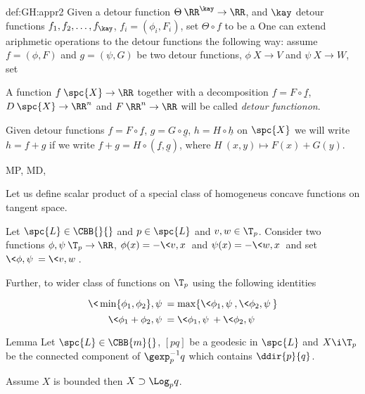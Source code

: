 {\begin{subthm}{def:GH:appr2}
Given a detour function $\Theta\:\RR^\kay\to\RR$, 
and $\kay$ detour functions $f_1,f_2,\dots, f_\kay$, $f_i=(\phi_i,F_i)$,
set $\Theta\circ f$ to be a 
One can extend ariphmetic operations to the detour functions the following way:
assume $f=(\phi,F)$ and $g=(\psi,G)$ be two detour functions, $\phi\:X\to V$ and $\psi\:X\to W$,
set 

A function $f\:\spc{X}\to\RR$ together with a decomposition $f=F\circ \underline f$, $D\:\spc{X}\to\RR^n$ and $F\:\RR^n\to\RR$  will be called \emph{detour functionon}.

Given detour functions $f=F\circ \underline f$, $g=G\circ \underline g$, $h=H\circ \underline h$ on $\spc{X}$ we will write $h=f+g$ if
we write 
$f+g=H\circ(\underline f,\underline g)$, where $H\:(x,y)\mapsto F(x)+G(y)$.


MP,
MD,

Let us define scalar product of a special class of homogeneus concave functions on tangent space.

Let $\spc{L}\in\CBB{}{}$ and $p\in \spc{L}$ and $v,w\in\T_p$.
Consider two functions $\phi,\psi\:\T_p\to\RR$,
$\phi(x)=-\<v,x\>$ and $\psi(x)=-\<w,x\>$ and set
$\<\phi,\psi\>=\<v,w\>$.

Further, to wider class of functions on $\T_p$ using the following identities

$$\<\min\{\phi_1,\phi_2\},\psi\>=\max\{\<\phi_1,\psi\>,\<\phi_2,\psi\>\}$$
$$\<\phi_1+\phi_2,\psi\>=\<\phi_1,\psi\>+\<\phi_2,\psi\>$$










\begin{thm}{Lemma}
Let $\spc{L}\in\CBB{m}{}$, 
$[pq]$ be a geodesic in $\spc{L}$
and $X\i \T_p$ be the connected component of $\gexp_p^{-1}q$ which contains $\ddir{p}{q}$.

Assume $X$ is bounded then $X\supset \Log_pq$.
\end{thm}


\end{subthm}}

